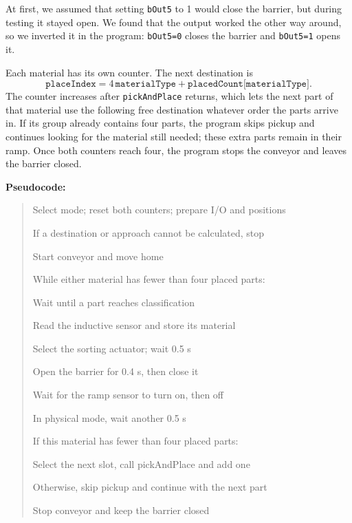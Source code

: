 \documentclass[11pt,a4paper]{article}
\begin{document}
At first, we assumed that setting \texttt{bOut5} to 1 would close the barrier, but during testing it stayed open. We found that the output worked the other way around, so we inverted it in the program: \texttt{bOut5=0} closes the barrier and \texttt{bOut5=1} opens it.

Each material has its own counter. The next destination is
\[
\texttt{placeIndex}=4\,\texttt{materialType}+\texttt{placedCount[materialType]}.
\]
The counter increases after \texttt{pickAndPlace} returns, which lets the next part of that material use the following free destination whatever order the parts arrive in. If its group already contains four parts, the program skips pickup and continues looking for the material still needed; these extra parts remain in their ramp. Once both counters reach four, the program stops the conveyor and leaves the barrier closed.

\noindent\begin{minipage}{\linewidth}
\textbf{Pseudocode:}
\begin{quote}\small\ttfamily\setlength{\parskip}{0pt}
Select mode; reset both counters; prepare I/O and positions\par
If a destination or approach cannot be calculated, stop\par
Start conveyor and move home\par
While either material has fewer than four placed parts:\par
\hspace*{1em}Wait until a part reaches classification\par
\hspace*{1em}Read the inductive sensor and store its material\par
\hspace*{1em}Select the sorting actuator; wait 0.5 s\par
\hspace*{1em}Open the barrier for 0.4 s, then close it\par
\hspace*{1em}Wait for the ramp sensor to turn on, then off\par
\hspace*{1em}In physical mode, wait another 0.5 s\par
\hspace*{1em}If this material has fewer than four placed parts:\par
\hspace*{2em}Select the next slot, call pickAndPlace and add one\par
\hspace*{1em}Otherwise, skip pickup and continue with the next part\par
Stop conveyor and keep the barrier closed
\end{quote}
\end{minipage}
\end{document}
